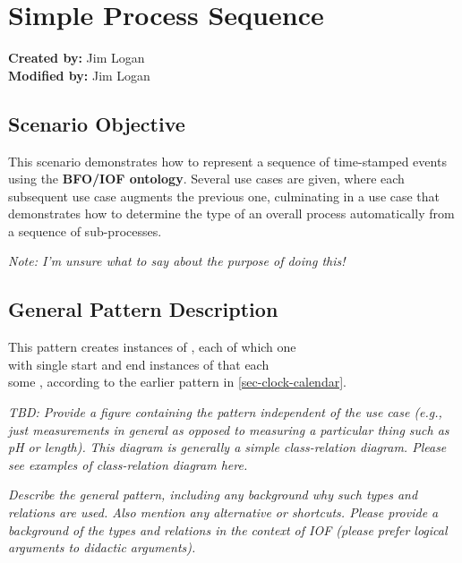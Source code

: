 
\section{Simple Process Sequence}

\textbf{Created by:} Jim Logan \\
\textbf{Modified by:} Jim Logan \\

\subsection*{Scenario Objective}
This scenario demonstrates how to represent a sequence of time-stamped events using the \textbf{BFO/IOF ontology}. Several use cases are given, where each subsequent use case augments the previous one, culminating in a use case that demonstrates how to determine the type of an overall process automatically from a sequence of sub-processes.

\textit{ 
Note: I'm unsure what to say about the purpose of doing this!
}

\subsection*{General Pattern Description}

This pattern creates instances of , each of which
one \\
with single start and end instances of
that each \\
 some
, according to the earlier pattern in
\ref{sec-clock-calendar}.

\textit{
TBD: Provide a figure containing the pattern independent of the use case (e.g., just measurements in general as opposed to measuring a particular thing such as pH or length).
}
\noindent \textit{This diagram is generally a simple class-relation diagram. Please see examples of class-relation diagram here.}

\textit{ 
Describe the general pattern, including any background why such types and relations are used. Also mention any alternative or shortcuts. Please provide a background of the types and relations in the context of IOF (please prefer logical arguments to didactic arguments).
}


